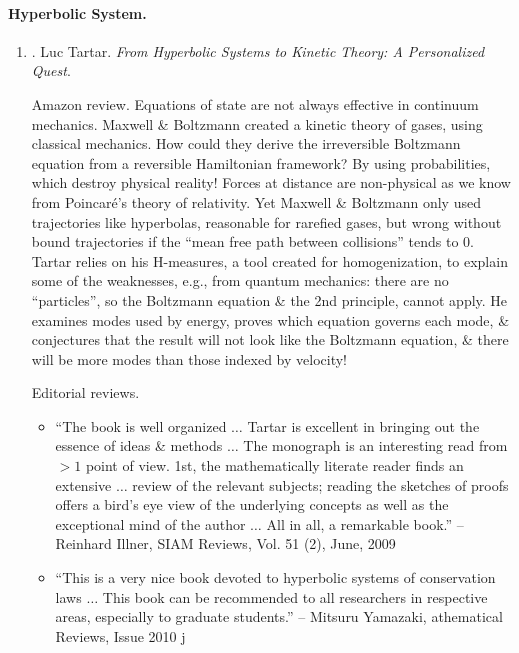 \documentclass{article}
\begin{document}
\paragraph{Hyperbolic System.}

\begin{enumerate}
	\item \cite{Tartar2008}. {\sc Luc Tartar}. {\it From Hyperbolic Systems to Kinetic Theory: A Personalized Quest}.
	
	{\sf Amazon review.} Equations of state are not always effective in continuum mechanics. {\sc Maxwell \& Boltzmann} created a kinetic theory of gases, using classical mechanics. How could they derive the irreversible Boltzmann equation from a reversible Hamiltonian framework? By using probabilities, which destroy physical reality! Forces at distance are non-physical as we know from {\sc Poincar\'e}'s theory of relativity. Yet {\sc Maxwell \& Boltzmann} only used trajectories like hyperbolas, reasonable for rarefied gases, but wrong without bound trajectories if the ``mean free path between collisions'' tends to 0. {\sc Tartar} relies on his H-measures, a tool created for homogenization, to explain some of the weaknesses, e.g., from quantum mechanics: there are no ``particles'', so the Boltzmann equation \& the 2nd principle, cannot apply. He examines modes used by energy, proves which equation governs each mode, \& conjectures that the result will not look like the Boltzmann equation, \& there will be more modes than those indexed by velocity!
	
	{\sf Editorial reviews.}
	\begin{itemize}
		\item ``The book is well organized $\ldots$ {\sc Tartar} is excellent in bringing out the essence of ideas \& methods $\ldots$ The monograph is an interesting read from $> 1$ point of view. 1st, the mathematically literate reader finds an extensive $\ldots$ review of the relevant subjects; reading the sketches of proofs offers a bird's eye view of the underlying concepts as well as the exceptional mind of the author $\ldots$ All in all, a remarkable book.'' -- {\sc Reinhard Illner}, SIAM Reviews, Vol. 51 (2), June, 2009
		\item ``This is a very nice book devoted to hyperbolic systems of conservation laws $\ldots$ This book can be recommended to all researchers in respective areas, especially to graduate students.'' -- {\sc Mitsuru Yamazaki}, athematical Reviews, Issue 2010 j
	\end{itemize}
\end{enumerate}
\end{document}
